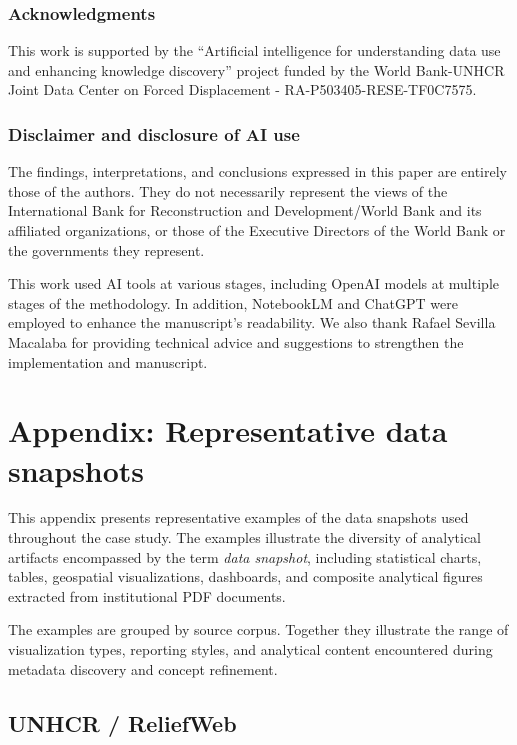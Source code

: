 \documentclass{article}
\begin{document}
\subsubsection*{Acknowledgments}
This work is supported by the “Artificial intelligence for understanding data use and enhancing knowledge discovery” project funded by the World Bank-UNHCR Joint Data Center on Forced Displacement - RA-P503405-RESE-TF0C7575.

\subsubsection*{Disclaimer and disclosure of AI use} 
The findings, interpretations, and conclusions expressed in this paper are entirely those of the authors. They do not necessarily represent the views of the International Bank for Reconstruction and Development/World Bank and its affiliated organizations, or those of the Executive Directors of the World Bank or the governments they represent.

This work used AI tools at various stages, including OpenAI models at multiple stages of the methodology. In addition, NotebookLM and ChatGPT were employed to enhance the manuscript’s readability. We also thank Rafael Sevilla Macalaba for providing technical advice and suggestions to strengthen the implementation and manuscript.




\newpage

\appendix

\section{Appendix: Representative data snapshots}
\label{appendix:datasnapshots}

This appendix presents representative examples of the data snapshots used throughout the case study. The examples illustrate the diversity of analytical artifacts encompassed by the term \emph{data snapshot}, including statistical charts, tables, geospatial visualizations, dashboards, and composite analytical figures extracted from institutional PDF documents.

The examples are grouped by source corpus. Together they illustrate the range of visualization types, reporting styles, and analytical content encountered during metadata discovery and concept refinement.

\subsection{UNHCR / ReliefWeb}
\end{document}
